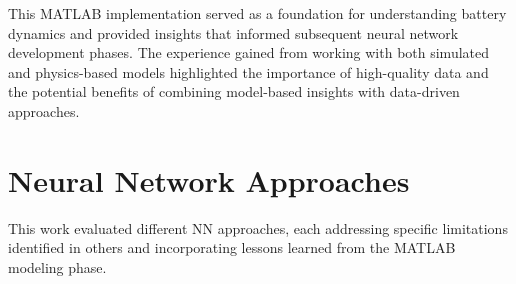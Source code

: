 This MATLAB implementation served as a foundation for understanding battery dynamics and provided insights that informed subsequent neural network development phases. The experience gained from working with both simulated and physics-based models highlighted the importance of high-quality data and the potential benefits of combining model-based insights with data-driven approaches.

\section{Neural Network Approaches}
\label{sec:neural_network_evolution}

This work evaluated different NN approaches, each addressing specific limitations identified in others and incorporating lessons learned from the MATLAB modeling phase.

